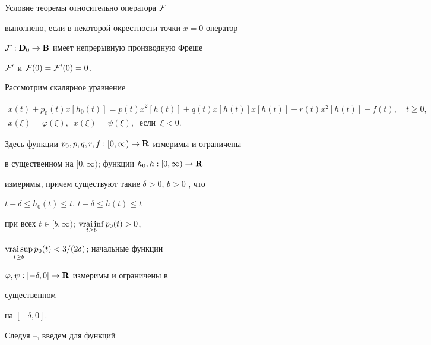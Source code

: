 \begin{note}


Условие теоремы относительно оператора $\cal F$


выполнено, если в некоторой окрестности точки $x=0$ оператор


${\cal F}:\bold {D}_0\to\bold {B}$ имеет непрерывную производную Фреше


${\cal F}'$ и ${\cal F}(0)={\cal F}'(0)=0$.


\end{note}





\begin{exam}


Рассмотрим скалярное уравнение


\begin{equation}


\begin{array}{c}


\Dot x(t)+p_0(t)x[h_0(t)]=


p(t)\Dot x^2[h(t)]+q(t)\Dot


x[h(t)]x[h(t)]+r(t)x^2[h(t)]


+f(t),\quad t\ge0,\\[2mm]


x(\xi)=\varphi(\xi),\ \;\Dot x(\xi)=\psi(\xi),\ \text{ если }\ \xi<0.


\end{array}


\end{equation}


Здесь функции $p_0,p,q,r,f:[0,\infty)\to\bold {R}$ измеримы и ограничены


в существенном на $[0,\infty)$; функции $h_0,h:[0,\infty)\to\bold {R}$


измеримы, причем существуют такие $\delta>0$, $b>0$ , что


$t-\delta\le h_0(t)\le t$, $t-\delta\le h(t)\le t$


при всех $t\in[b,\infty)$; $\vraiinf\limits_{t\ge b}p_0(t)>0$,


$\vraisup\limits_{t\ge b}p_0(t)<3/(2\delta)$; начальные функции


$\varphi, \psi:[-\delta,0]\to\bold {R}$ измеримы и ограничены в


существенном


на $[-\delta,0]$.





Следуя \cite{3}--\cite{5}, введем для функций



\end{exam}
